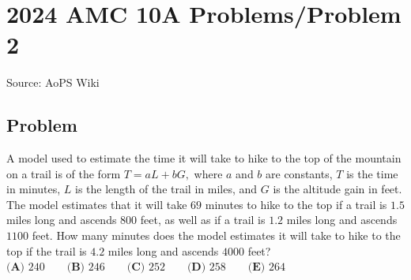 \documentclass[12pt]{article}
\begin{document}
\section*{{2024 AMC 10A Problems/Problem 2}}
Source: AoPS Wiki

\subsection*{Problem}
A model used to estimate the time it will take to hike to the top of the mountain on a trail is of the form $T=aL+bG,$ where $a$ and $b$ are constants, $T$ is the time in minutes, $L$ is the length of the trail in miles, and $G$ is the altitude gain in feet. The model estimates that it will take $69$ minutes to hike to the top if a trail is $1.5$ miles long and ascends $800$ feet, as well as if a trail is $1.2$ miles long and ascends $1100$ feet. How many minutes does the model estimates it will take to hike to the top if the trail is $4.2$ miles long and ascends $4000$ feet? $\textbf{(A) }240\qquad\textbf{(B) }246\qquad\textbf{(C) }252\qquad\textbf{(D) }258\qquad\textbf{(E) }264$
\end{document}
